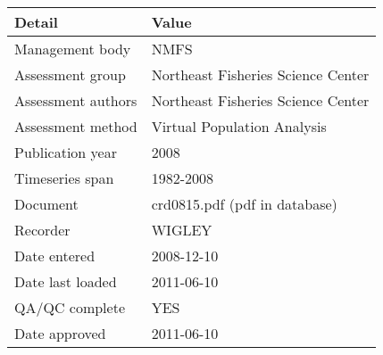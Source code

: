 \begin{table}[htb]
\centering
\begin{tabular}{lp{7cm}}
\toprule
Detail & Value \\
\midrule
Management body    & NMFS                               \\
Assessment group   & Northeast Fisheries Science Center \\
Assessment authors & Northeast Fisheries Science Center \\
Assessment method  & Virtual Population Analysis        \\
Publication year   & 2008                               \\
Timeseries span    & 1982-2008                          \\
Document           & crd0815.pdf (pdf in database)      \\
Recorder           & WIGLEY                             \\
Date entered       & 2008-12-10                         \\
Date last loaded   & 2011-06-10                         \\
QA/QC complete     & YES                                \\
Date approved      & 2011-06-10                         \\
\bottomrule
\end{tabular}
\label{tab:assessdet}
\end{table}
